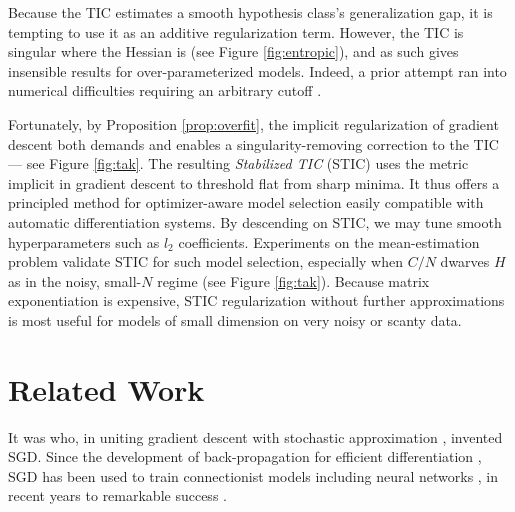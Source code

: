 \documentclass{article}
\begin{document}
        Because the TIC estimates a smooth hypothesis class's generalization
        gap, it is tempting to use it as an additive regularization term.
        However, the TIC is singular where the Hessian is (see Figure
        \ref{fig:entropic}), and as such gives insensible results for
        over-parameterized models.  Indeed, a prior attempt ran into numerical
        difficulties requiring an arbitrary cutoff \citep{di18}. 

        Fortunately, by Proposition \ref{prop:overfit}, the implicit
        regularization of gradient descent both demands and enables a
        singularity-removing correction to the TIC --- see Figure
        \ref{fig:tak}.  The resulting \emph{Stabilized TIC} (STIC) uses the
        metric implicit in gradient descent to threshold flat from sharp
        minima.  It thus offers a principled method for optimizer-aware model
        selection easily compatible with automatic differentiation systems.  By
        descending on STIC, we may tune smooth hyperparameters such as $l_2$
        coefficients.  Experiments on the mean-estimation problem validate STIC
        for such model selection, especially when $C/N$ dwarves $H$ as in the
        noisy, small-$N$ regime (see Figure \ref{fig:tak}).  Because matrix
        exponentiation is expensive, STIC regularization without further
        approximations is most useful for models of small dimension
        on very noisy or scanty data.


\section{Related Work}


    It was \citet{ki52} who, in uniting gradient descent \citep{ca47} with
    stochastic approximation \citep{ro51}, invented SGD.  Since the development
    of back-propagation for efficient differentiation \citep{we74}, SGD
    has been used to train connectionist models including neural
    networks \citep{bo91}, in recent years to remarkable success \citep{le15}.
\end{document}
